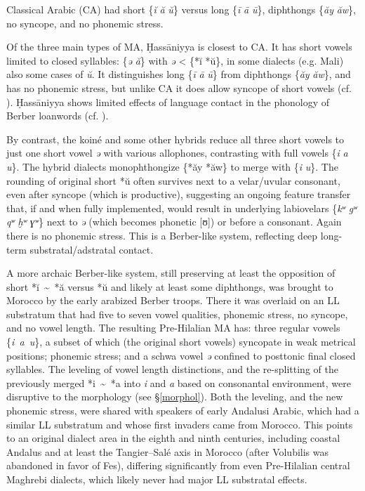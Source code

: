 \documentclass[output=paper]{langsci/langscibook}
\begin{document}
Classical Arabic (CA) had short \{\textit{ĭ} \textit{ă} \textit{ŭ}\} versus long \{\textit{ī} \textit{ā} \textit{ū}\}, diphthongs \{\textit{ăy} \textit{ăw}\}, no syncope, and no phonemic stress. 

Of the three main types of MA, Ḥassāniyya is closest to CA. It has short vowels limited to closed syllables: \{\textit{ə} \textit{ă}\} with \textit{ə} < \{*ĭ *ŭ\}, in some dialects (e.g. Mali) also some cases of \textit{ŭ}. It distinguishes long \{\textit{ī} \textit{ā} \textit{ū}\} from diphthongs \{\textit{ăy} \textit{ăw}\}, and has no phonemic stress, but unlike CA it does allow syncope of short vowels (cf. \citealt{Taine-Cheikh1988article}). Ḥassāniyya shows limited effects of language contact in the phonology of Berber loanwords (cf. \citealt{Taine-Cheikh1997Zenaga}).

By contrast, the koiné and some other hybrids reduce all three short vowels to just one short vowel \textit{ə} with various allophones, contrasting with full vowels \{\textit{i} \textit{a} \textit{u}\}. The hybrid dialects monophthongize \{*ăy *ăw\} to merge with \{\textit{i} \textit{u}\}. The rounding of original short *ŭ often survives next to a velar/uvular consonant, even after syncope (which is productive), suggesting an ongoing feature transfer that, if and when fully implemented, would result in underlying labiovelars \{\textit{kʷ} \textit{gʷ} \textit{qʷ} \textit{ḫʷ} \textit{ɣʷ}\} next to \textit{ə} (which becomes phonetic [ʊ]) or before a consonant. Again there is no phonemic stress. This is a Berber-like system, reflecting deep long-term substratal/adstratal contact.

A more archaic Berber-like system, still preserving at least the opposition of short *ĭ~{\textasciitilde}~*ă versus *ŭ and likely at least some diphthongs, was brought to Morocco by the early arabized Berber troops. There it was overlaid on an LL substratum that had five to seven vowel qualities, phonemic stress, no syncope, and no vowel length. The resulting Pre-Hilalian MA has: three regular vowels \{\textit{i~a~u}\}, a subset of which (the original short vowels) syncopate in weak metrical positions; phonemic stress; and a schwa vowel \textit{ə} confined to posttonic final closed syllables. The leveling of vowel length distinctions, and the re-splitting of the previously merged *i~{\textasciitilde}~*a into \textit{i} and \textit{a} based on consonantal environment, were disruptive to the morphology (see §\ref{morphol}). Both the leveling, and the new phonemic stress, were shared with speakers of early Andalusi Arabic, which had a similar LL substratum and whose first invaders came from Morocco. This points to an original dialect area in the eighth and ninth centuries, including coastal Andalus and at least the Tangier–Salé axis in Morocco (after Volubilis was abandoned in favor of Fes), differing significantly from even Pre-Hilalian central Maghrebi dialects, which likely never had major LL substratal effects. 
\end{document}

